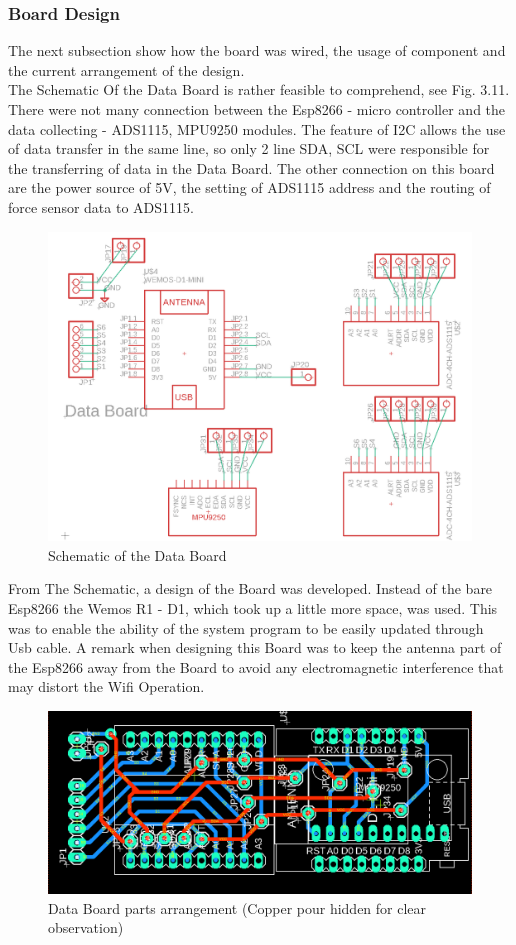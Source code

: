 \documentclass[12 pt, a4paper]{thesis}
\begin{document}
\subsubsection{Board Design}
The next subsection show how the board was wired,  the usage of component and the current arrangement of the design.\\
The Schematic Of the Data Board is rather feasible to comprehend, see Fig. 3.11. There were not many connection between the Esp8266 - micro controller and the data collecting - ADS1115, MPU9250 modules. The feature of I2C allows the use of data transfer in the same line, so only 2 line SDA, SCL were responsible for the transferring of data in the Data Board. The other connection on this board are the power source of 5V, the setting of ADS1115 address and the routing of force sensor data to ADS1115.  \\
\begin{figure}[hbt!]
\centering
\includegraphics[width = 150mm]{DataBoardSch.png}
\caption{Schematic of the Data Board}
\end{figure}
From The Schematic, a design of the Board was developed. Instead of the bare Esp8266 the Wemos R1 - D1, which took up a little more space, was used. This was to enable the ability of the system program to be easily updated through Usb cable. A remark when designing this Board was to keep the antenna part of the Esp8266 away from the Board to avoid any electromagnetic interference that may distort the Wifi Operation.\\
\begin{figure}[hbt!]
\centering
\includegraphics[width = 150mm]{DataBoard.png}
\caption{Data Board parts arrangement (Copper pour hidden for clear observation)}
\end{figure}
\end{document}
